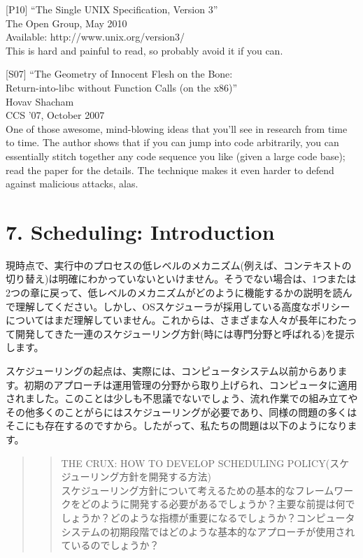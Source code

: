 {[}P10{]} ``The Single UNIX Specification, Version 3''\\
The Open Group, May 2010\\
Available: http://www.unix.org/version3/\\
This is hard and painful to read, so probably avoid it if you can.

{[}S07{]} ``The Geometry of Innocent Flesh on the Bone:\\
Return-into-libc without Function Calls (on the x86)''\\
Hovav Shacham\\
CCS '07, October 2007\\
One of those awesome, mind-blowing ideas that you'll see in research
from time to time. The author shows that if you can jump into code
arbitrarily, you can essentially stitch together any code sequence you
like (given a large code base); read the paper for the details. The
technique makes it even harder to defend against malicious attacks,
alas.

\hypertarget{scheduling-introduction}{%
\section*{7. Scheduling: Introduction}\label{scheduling-introduction}}

現時点で、実行中のプロセスの低レベルのメカニズム(例えば、コンテキストの切り替え)は明確にわかっていないといけません。そうでない場合は、1つまたは2つの章に戻って、低レベルのメカニズムがどのように機能するかの説明を読んで理解してください。しかし、OSスケジューラが採用している高度なポリシーについてはまだ理解していません。これからは、さまざまな人々が長年にわたって開発してきた一連のスケジューリング方針(時には専門分野と呼ばれる)を提示します。

スケジューリングの起点は、実際には、コンピュータシステム以前からあります。初期のアプローチは運用管理の分野から取り上げられ、コンピュータに適用されました。このことは少しも不思議でないでしょう、流れ作業での組み立てやその他多くのことがらにはスケジューリングが必要であり、同様の問題の多くはそこにも存在するのですから。したがって、私たちの問題は以下のようになります。

\begin{quote}
\begin{quote}
THE CRUX: HOW TO DEVELOP SCHEDULING
POLICY(スケジューリング方針を開発する方法)\\
スケジューリング方針について考えるための基本的なフレームワークをどのように開発する必要があるでしょうか？主要な前提は何でしょうか？どのような指標が重要になるでしょうか？コンピュータシステムの初期段階ではどのような基本的なアプローチが使用されているのでしょうか？
\end{quote}
\end{quote}

